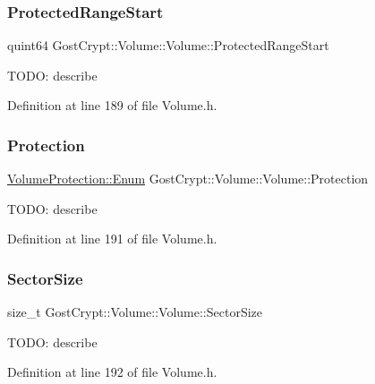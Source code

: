 \subsubsection{\texorpdfstring{Protected\+Range\+Start}{ProtectedRangeStart}}
{\footnotesize\ttfamily quint64 Gost\+Crypt\+::\+Volume\+::\+Volume\+::\+Protected\+Range\+Start\hspace{0.3cm}{\ttfamily [protected]}}

T\+O\+DO\+: describe 

Definition at line 189 of file Volume.\+h.

\mbox{\label{class_gost_crypt_1_1_volume_1_1_volume_a5084d4117c347b230bd2abbdef483e4a}} 
\subsubsection{\texorpdfstring{Protection}{Protection}}
{\footnotesize\ttfamily \hyperlink{struct_gost_crypt_1_1_volume_1_1_volume_protection_a8dd7301af256c893dc1e0a08c7530c7f}{Volume\+Protection\+::\+Enum} Gost\+Crypt\+::\+Volume\+::\+Volume\+::\+Protection\hspace{0.3cm}{\ttfamily [protected]}}

T\+O\+DO\+: describe 

Definition at line 191 of file Volume.\+h.

\mbox{\label{class_gost_crypt_1_1_volume_1_1_volume_af26888d1aebbd9e17e87d8436538b1db}} 
\subsubsection{\texorpdfstring{Sector\+Size}{SectorSize}}
{\footnotesize\ttfamily size\+\_\+t Gost\+Crypt\+::\+Volume\+::\+Volume\+::\+Sector\+Size\hspace{0.3cm}{\ttfamily [protected]}}

T\+O\+DO\+: describe 

Definition at line 192 of file Volume.\+h.

